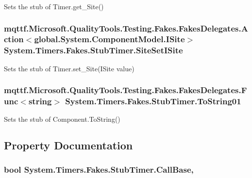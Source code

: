 Sets the stub of Timer.\-get\-\_\-\-Site()

\hypertarget{class_system_1_1_timers_1_1_fakes_1_1_stub_timer_a9da70e08cc0a0b41635047a1a83d5dc1}{
\subsubsection[{Site\-Set\-I\-Site}]{\setlength{\rightskip}{0pt plus 5cm}mqttf.\-Microsoft.\-Quality\-Tools.\-Testing.\-Fakes.\-Fakes\-Delegates.\-Action$<$global.\-System.\-Component\-Model.\-I\-Site$>$ System.\-Timers.\-Fakes.\-Stub\-Timer.\-Site\-Set\-I\-Site}}\label{class_system_1_1_timers_1_1_fakes_1_1_stub_timer_a9da70e08cc0a0b41635047a1a83d5dc1}


Sets the stub of Timer.\-set\-\_\-\-Site(\-I\-Site value)

\hypertarget{class_system_1_1_timers_1_1_fakes_1_1_stub_timer_affdc055dca4eff918edb2681c8f7798c}{
\subsubsection[{To\-String01}]{\setlength{\rightskip}{0pt plus 5cm}mqttf.\-Microsoft.\-Quality\-Tools.\-Testing.\-Fakes.\-Fakes\-Delegates.\-Func$<$string$>$ System.\-Timers.\-Fakes.\-Stub\-Timer.\-To\-String01}}\label{class_system_1_1_timers_1_1_fakes_1_1_stub_timer_affdc055dca4eff918edb2681c8f7798c}


Sets the stub of Component.\-To\-String()



\subsection{Property Documentation}
\hypertarget{class_system_1_1_timers_1_1_fakes_1_1_stub_timer_ab78aaeab87ab00b50fb8eeaf71ba98c0}{
\subsubsection[{Call\-Base}]{\setlength{\rightskip}{0pt plus 5cm}bool System.\-Timers.\-Fakes.\-Stub\-Timer.\-Call\-Base\hspace{0.3cm}{\ttfamily [get]}, {\ttfamily [set]}}}\label{class_system_1_1_timers_1_1_fakes_1_1_stub_timer_ab78aaeab87ab00b50fb8eeaf71ba98c0}


